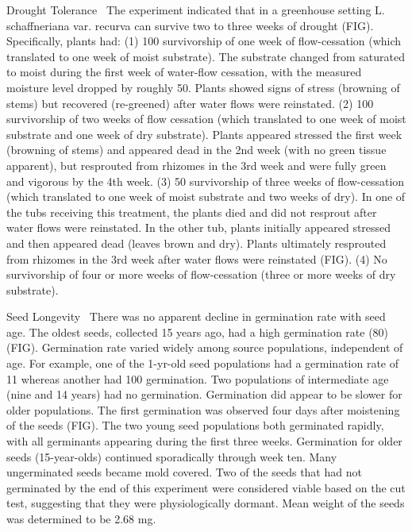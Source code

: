 \documentclass[multicol]{elsarticle}
\begin{document}
\begin{multicols}{2}
\begin{subsection}{Drought Tolerance}
\,
The experiment indicated that in a greenhouse setting L. schaffneriana var. recurva can survive two to three weeks of drought (FIG). Specifically, plants had: (1) 100 survivorship of one week of flow-cessation (which translated to one week of moist substrate). The substrate changed from saturated to moist during the first week of water-flow cessation, with the measured moisture level dropped by roughly 50. Plants showed signs of stress (browning of stems) but recovered (re-greened) after water flows were reinstated.  (2) 100 survivorship of two weeks of flow cessation (which translated to one week of moist substrate and one week of dry substrate). Plants appeared stressed the first week (browning of stems) and appeared dead in the 2nd week (with no green tissue apparent), but resprouted from rhizomes in the 3rd week and were fully green and vigorous by the 4th week. (3) 50 survivorship of three weeks of flow-cessation (which translated to one week of moist substrate and two weeks of dry). In one of the tubs receiving this treatment, the plants died and did not resprout after water flows were reinstated. In the other tub, plants initially appeared stressed and then appeared dead (leaves brown and dry). Plants ultimately resprouted from rhizomes in the 3rd week after water flows were reinstated (FIG). (4) No survivorship of four or more weeks of flow-cessation (three or more weeks of dry substrate).
\end{subsection}

\begin{subsection}{Seed Longevity}
\,
There was no apparent decline in germination rate with seed age. The oldest seeds, collected 15 years ago, had a high germination rate (80) (FIG). Germination rate varied widely among source populations, independent of age. For example, one of the 1-yr-old seed populations had a germination rate of 11 whereas another had 100 germination. Two populations of intermediate age (nine and 14 years) had no germination. Germination did appear to be slower for older populations. The first germination was observed four days after moistening of the seeds (FIG). The two young seed populations both germinated rapidly, with all germinants appearing during the first three weeks. Germination for older seeds (15-year-olds) continued sporadically through week ten.  Many ungerminated seeds became mold covered. Two of the seeds that had not germinated by the end of this experiment were considered viable based on the cut test, suggesting that they were physiologically dormant.  Mean weight of the seeds was determined to be 2.68 mg.
\end{subsection}


\end{multicols}
\end{document}
